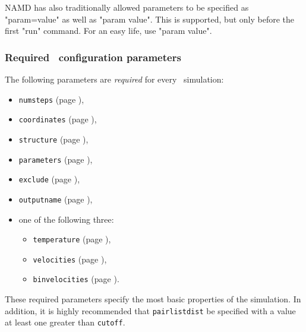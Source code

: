 NAMD has also traditionally allowed parameters to be specified as
"param=value" as well as "param value".  This is supported, but only
before the first "run" command.  For an easy life, use "param value".

\subsubsection{Required \NAMD\ configuration parameters}
\label{section:requiredparams}

The following parameters are {\em required} for every
\NAMD\ simulation:

\begin{itemize}

\item
{\tt numsteps} (page \pageref{param:numsteps}),

\item
{\tt coordinates} (page \pageref{param:coordinates}),

\item
{\tt structure} (page \pageref{param:structure}),

\item
{\tt parameters} (page \pageref{param:parameters}),

\item
{\tt exclude} (page \pageref{param:exclude}), 

\item
{\tt outputname} (page \pageref{param:outputname}), 

\item
one of the following three:
\begin{itemize}
\item
{\tt temperature} (page \pageref{param:temperature}),

\item
{\tt velocities} (page \pageref{param:velocities}),

\item
{\tt binvelocities} (page \pageref{param:binvelocities}).
\end{itemize}

\end{itemize}

\noindent These required parameters specify the most basic properties of
the simulation.  %
In addition, it is highly recommended that 
{\tt pairlistdist} be specified with a 
value at least one greater than {\tt cutoff}.

